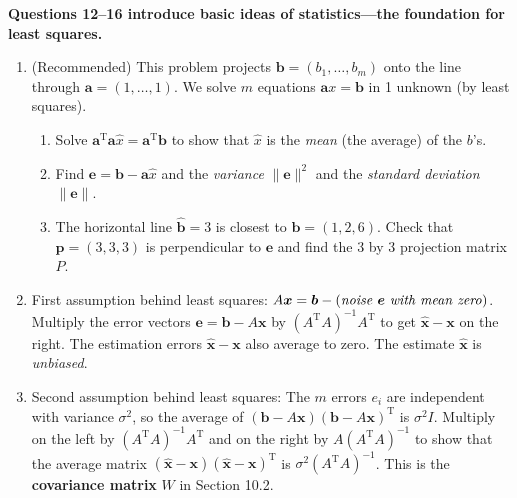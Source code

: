 \documentclass[14pt, a4paper]{article}
\begin{document}
\noindent \textbf{Questions 12--16 introduce basic ideas of statistics---the foundation for least squares.}

\begin{enumerate}[resume]
    \item (Recommended) This problem projects $\boldsymbol{b} = (b_1, \dots, b_m)$ onto the line through $\boldsymbol{a} = (1, \dots, 1)$. We solve $m$ equations $\boldsymbol{a}x = \boldsymbol{b}$ in 1 unknown (by least squares).
          \begin{enumerate}
              \item Solve $\boldsymbol{a}^{\mathrm{T}}\boldsymbol{a}\widehat{x} = \boldsymbol{a}^{\mathrm{T}}\boldsymbol{b}$ to show that $\widehat{x}$ is the \emph{mean} (the average) of the $b$'s.
              \item Find $\boldsymbol{e} = \boldsymbol{b} - \boldsymbol{a}\widehat{x}$ and the \emph{variance} $\|\boldsymbol{e}\|^2$ and the \emph{standard deviation} $\|\boldsymbol{e}\|$.
              \item The horizontal line $\widehat{\boldsymbol{b}} = 3$ is closest to $\boldsymbol{b} = (1, 2, 6)$. Check that $\boldsymbol{p} = (3, 3, 3)$ is perpendicular to $\boldsymbol{e}$ and find the 3 by 3 projection matrix $P$.
          \end{enumerate}

    \item First assumption behind least squares: $A\boldsymbol{x} = \boldsymbol{b} - (\text{\emph{noise} } \boldsymbol{e} \text{ \emph{with mean zero}})$. Multiply the error vectors $\boldsymbol{e} = \boldsymbol{b} - A\boldsymbol{x}$ by $(A^{\mathrm{T}}A)^{-1}A^{\mathrm{T}}$ to get $\widehat{\boldsymbol{x}} - \boldsymbol{x}$ on the right. The estimation errors $\widehat{\boldsymbol{x}} - \boldsymbol{x}$ also average to zero. The estimate $\widehat{\boldsymbol{x}}$ is \emph{unbiased}.

    \item Second assumption behind least squares: The $m$ errors $e_i$ are independent with variance $\sigma^2$, so the average of $(\boldsymbol{b} - A\boldsymbol{x})(\boldsymbol{b} - A\boldsymbol{x})^{\mathrm{T}}$ is $\sigma^2 I$. Multiply on the left by $(A^{\mathrm{T}}A)^{-1}A^{\mathrm{T}}$ and on the right by $A(A^{\mathrm{T}}A)^{-1}$ to show that the average matrix $(\widehat{\boldsymbol{x}} - \boldsymbol{x})(\widehat{\boldsymbol{x}} - \boldsymbol{x})^{\mathrm{T}}$ is $\sigma^2 (A^{\mathrm{T}}A)^{-1}$. This is the \textbf{covariance matrix} $W$ in Section 10.2.


\end{enumerate}
\end{document}
